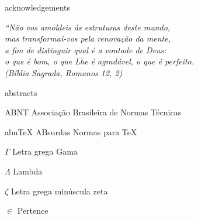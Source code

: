 {acknowledgements}

\begin{epigrafe}
\vspace*{\fill}
\begin{flushright}
  \textit{``Não vos amoldeis às estruturas deste mundo, \\
    mas transformai-vos pela renovação da mente, \\
    a fim de distinguir qual é a vontade de Deus: \\
    o que é bom, o que Lhe é agradável, o que é perfeito.\\
    (Bíblia Sagrada, Romanos 12, 2)}
\end{flushright}
\end{epigrafe}

{abstracts}

\listoffigures*
\cleardoublepage{}

\listofquadros*
\cleardoublepage{}

\listoftables*
\cleardoublepage{}

\begin{siglas}
  \item[ABNT] Associação Brasileira de Normas Técnicas
  \item[abnTeX] ABsurdas Normas para TeX
\end{siglas}

\begin{simbolos}
  \item[$ \Gamma $] Letra grega Gama
  \item[$ \Lambda $] Lambda
  \item[$ \zeta $] Letra grega minúscula zeta
  \item[$ \in $] Pertence
\end{simbolos}

\tableofcontents*
\cleardoublepage{}
